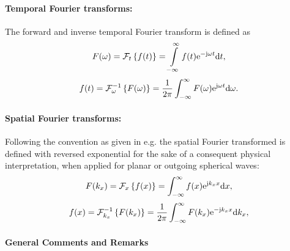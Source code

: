\printnomenclature
%
\vspace{1cm}
\paragraph{Temporal Fourier transforms:}
The forward and inverse temporal Fourier transform is defined as 
\begin{equation}
\label{eq:temporal_fourier_transform_def}
F(\omega) = \mathcal{F}_t \left\{ f(t) \right\} = \int\limits_ {-\infty}^{\infty} f(t) \mathrm{e}^{-\mathrm{j} \omega t} \mathrm{d} t,
\end{equation}
\begin{equation}
\label{eq:temporal_inverse_fourier_transform_def}
f(t) = \mathcal{F}_{\omega}^{-1} \left\{ F(\omega) \right\} = \frac{1}{2\pi} \int_ {-\infty}^{\infty} F(\omega) \mathrm{e}^{ \mathrm{j} \omega t} \mathrm{d} \omega.
\end{equation}
%
\paragraph{Spatial Fourier transforms:}
Following the convention as given in e.g. \cite{Williams1999} the spatial Fourier transformed is defined with reversed exponential for the sake of a consequent physical interpretation, when applied for planar or outgoing spherical waves:
\begin{equation}
\label{eq:spatial_fourier_transform_def}
F(k_x) = \mathcal{F}_x \left\{ f(x) \right\} = \int_ {-\infty}^{\infty} f(x) \mathrm{e}^{\mathrm{j} k_x x} \mathrm{d} x,
\end{equation}
\begin{equation}
\label{eq:spatial_inverse_fourier_transform_def}
f(x) = \mathcal{F}_{k_x}^{-1} \left\{ F(k_x) \right\} = \frac{1}{2\pi} \int_ {-\infty}^{\infty} F(k_x) \mathrm{e}^{ -\mathrm{j} k_x x} \mathrm{d} k_x,
\end{equation}


%

\paragraph{General Comments and Remarks}



